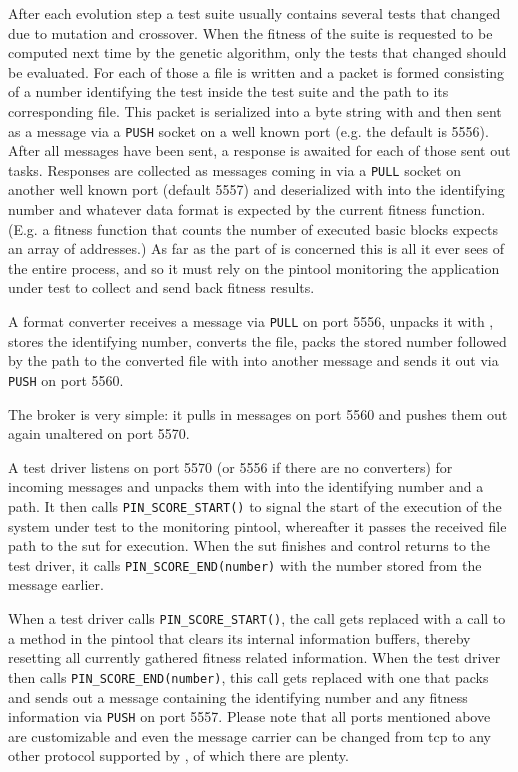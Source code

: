 After each evolution step a test suite usually contains several tests that changed due to mutation and
crossover. When the fitness of the suite is requested to be computed next time by the genetic algorithm, 
only the tests that changed should be evaluated. For each of those a file is written and a packet is 
formed consisting of a number identifying the test inside the test suite and the path to its corresponding 
file. This packet is serialized into a byte string with \msgpack and then sent as a \zmq message via a 
\texttt{PUSH} socket on a well known port (e.g. the default is 5556). After all messages have been sent,
a response is awaited for each of those sent out tasks. Responses are collected as \zmq messages coming 
in via a \texttt{PULL} socket on another well known port (default 5557) and deserialized with \msgpack 
into the identifying number and whatever data format is expected by the current fitness function. 
(E.g. a fitness function that counts the number of executed basic blocks expects an array of addresses.)
As far as the \java part of \xmlmate is concerned this is all it ever sees of the entire process, and so it 
must rely on the pintool monitoring the application under test to collect and send back fitness results.


A format converter receives a \zmq message via \texttt{PULL} on port 5556, unpacks it with \msgpack, 
stores the identifying number, converts the file, packs the stored number followed by the path to 
the converted file with \msgpack into another \zmq message and sends it out via \texttt{PUSH} on port 5560.


The broker is very simple: it pulls in messages on port 5560 and pushes them out again unaltered on port 5570.


A test driver listens on port 5570 (or 5556 if there are no converters) for incoming \zmq messages and unpacks
them with \msgpack into the identifying number and a path. It then calls \texttt{PIN\_SCORE\_START()} to 
signal the start of the execution of the system under test to the monitoring pintool, whereafter it passes the 
received file path to the sut for execution. When the sut finishes and control returns to the test driver, 
it calls \texttt{PIN\_SCORE\_END(number)} with the number stored from the message earlier.


When a test driver calls \texttt{PIN\_SCORE\_START()}, the call gets replaced with a call to a method in the 
pintool that clears its internal information buffers, thereby resetting all currently gathered fitness related 
information. When the test driver then calls \texttt{PIN\_SCORE\_END(number)}, this call gets replaced with 
one that packs and sends out a message containing the identifying number and any fitness information via \zmq 
\texttt{PUSH} on port 5557.
Please note that all ports mentioned above are customizable and even the message carrier can be changed from
tcp to any other protocol supported by \zmq, of which there are plenty. 


